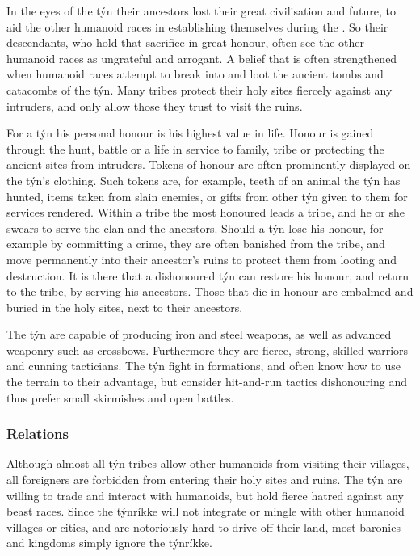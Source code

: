 In the eyes of the týn their ancestors lost their great civilisation and
future, to aid the other humanoid races in establishing themselves during
the . So their descendants, who hold that
sacrifice in great honour, often see the other humanoid races as ungrateful
and arrogant. A belief that is often strengthened when humanoid races attempt
to break into and loot the ancient tombs and catacombs of the týn. Many tribes
protect their holy sites fiercely against any intruders, and only allow those
they trust to visit the ruins.

For a týn his personal honour is his highest value in life. Honour is gained
through the hunt, battle or a life in service to family, tribe or protecting
the ancient sites from intruders. Tokens of honour are often prominently
displayed on the týn's clothing. Such tokens are, for example, teeth of an
animal the týn has hunted, items taken from slain enemies, or gifts from
other týn given to them for services rendered. Within a tribe the most
honoured leads a tribe, and he or she swears to serve the clan and the
ancestors. Should a týn lose his honour, for example by committing a crime,
they are often banished from the tribe, and move permanently into their
ancestor's ruins to protect them from looting and destruction. It is there
that a dishonoured týn can restore his honour, and return to the tribe, by
serving his ancestors. Those that die in honour are embalmed and buried in the
holy sites, next to their ancestors.

The týn are capable of producing iron and steel weapons, as well as advanced
weaponry such as crossbows. Furthermore they are fierce, strong, skilled
warriors and cunning tacticians. The týn fight in formations, and often know
how to use the terrain to their advantage, but consider hit-and-run tactics
dishonouring and thus prefer small skirmishes and open battles.

\subsubsection{Relations}


Although almost all týn tribes allow other humanoids from visiting their
villages, all foreigners are forbidden from entering their holy sites and
ruins. The týn are willing to trade and interact with humanoids, but hold
fierce hatred against any beast races. Since the týnríkke will not integrate
or mingle with other humanoid villages or cities, and are notoriously hard to
drive off their land, most baronies and kingdoms simply ignore the týnríkke.

